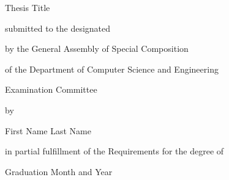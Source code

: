 \thispagestyle{empty}
\begin{center}
	{\LARGE Thesis Title}
	\par
	\vspace{2.5cm} {\Large \csethesisTypeEn}
	
	\vspace{1.25cm} {\Large submitted to the designated}
	
	\vspace{0.75cm} {\Large by the General Assembly of Special Composition}
	
	\vspace{0.25cm} {\Large of the Department of Computer Science and Engineering}
	
	\vspace{0.25cm} {\Large Examination Committee}
	
	\vspace{1.25cm} {\Large by}
	
	\vspace{1.75cm} {\LARGE First Name Last Name}
	
	\vspace{1.25cm} {\Large in partial fulfillment of the Requirements for the degree of}
	
	\vspace{1.75cm} {\Large \csediplwmaEn}
	
	\vspace{0.5cm} {\Large \csesubjectEn}
	
	\vspace{0.5cm} {\Large \cseexpertiseEn}
	\par
	\vfill {\Large Graduation Month and Year}
\end{center}